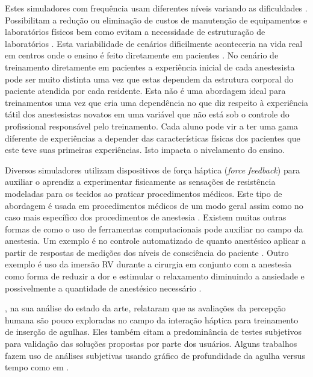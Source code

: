 Estes simuladores com frequência usam diferentes níveis variando as dificuldades \cite{Ullrich2012}. Possibilitam a redução ou eliminação de custos de manutenção de equipamentos e laboratórios físicos bem como evitam a necessidade de estruturação de laboratórios \cite{Silva2018}. 
Esta variabilidade de cenários dificilmente aconteceria na vida real em centros onde o ensino é feito diretamente em pacientes \cite{Udani2015}. No cenário de treinamento diretamente em pacientes a experiência inicial de cada anestesista pode ser muito distinta uma vez que estas dependem da estrutura corporal do paciente atendida por cada residente. Esta não é uma abordagem ideal para treinamentos uma vez que cria uma dependência no que diz respeito à experiência tátil dos anestesistas novatos em uma variável que não está sob o controle do profissional responsável pelo treinamento. Cada aluno pode vir a ter uma gama diferente de experiências a depender das características físicas dos pacientes que este teve suas primeiras experiências. Isto impacta o nivelamento do ensino.

Diversos simuladores utilizam dispositivos de força háptica (\textit{force feedback}) para auxiliar o aprendiz a experimentar fisicamente as sensações de resistência modeladas para os tecidos ao praticar procedimentos médicos. Este tipo de abordagem é usada em procedimentos médicos de um modo geral \cite{Escobar-Castillejos2016, Patel2021} assim como no caso mais específico dos procedimentos de anestesia \cite{Vaughan2013, Collaco2021}. Existem muitas outras formas de como o uso de ferramentas computacionais pode auxiliar no campo da anestesia. Um exemplo é no controle automatizado de quanto anestésico aplicar a partir de respostas de medições dos níveis de consciência do paciente \cite{Mendez2009}. Outro exemplo é uso da imersão \acrshort{RV} durante a cirurgia em conjunto com a anestesia como forma de reduzir a dor e estimular o relaxamento diminuindo a ansiedade e possivelmente a quantidade de anestésico necessário \cite{Eijlers2019}.

\textcite{Correa2019}, na sua análise do estado da arte, relataram que as avaliações da percepção humana são pouco exploradas no campo da interação háptica para treinamento de inserção de agulhas. Eles também citam a predominância de testes subjetivos para validação das soluções propostas por parte dos usuários. Alguns trabalhos fazem uso de análises subjetivas usando gráfico de profundidade da agulha versus tempo como em \textcite{Magill2010}. 

